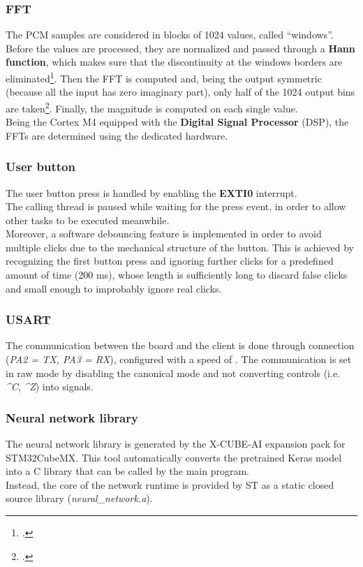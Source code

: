 \documentclass[12pt]{article}
\begin{document}
\subsubsection{FFT}
The PCM samples are considered in blocks of 1024 values, called ``windows''. Before the values are processed, they are normalized and passed through a \textbf{Hann function}, which makes sure that the discontinuity at the windows borders are eliminated\footcite{engelberg2008digital}. Then the FFT is computed and, being the output symmetric (because all the input has zero imaginary part), only half of the 1024 output bins are taken\footcite{parker2017digital}. Finally, the magnitude is computed on each single value.\\
Being the Cortex M4 equipped with the \textbf{Digital Signal Processor} (DSP), the FFTs are determined using the dedicated hardware.

\subsubsection{User button}
The user button press is handled by enabling the \textbf{EXTI0} interrupt.\\
The calling thread is paused while waiting for the press event, in order to allow other tasks to be executed meanwhile.\\
Moreover, a software debouncing feature is implemented in order to avoid multiple clicks due to the mechanical structure of the button. This is achieved by recognizing the first button press and ignoring further clicks for a predefined amount of time (200 ms), whose length is sufficiently long to discard false clicks and small enough to improbably ignore real clicks.

\subsubsection{USART}
The communication between the board and the client is done through  connection (\textit{PA2 = TX, PA3 = RX}), configured with a speed of . The communication is set in raw mode by disabling the canonical mode and not converting controls (i.e. \textit{\^{}C}, \textit{\^{}Z}) into signals.

\subsubsection{Neural network library}
The neural network library is generated by the X-CUBE-AI expansion pack for STM32CubeMX. This tool automatically converts the pretrained Keras model into a C library that can be called by the main program.\\
Instead, the core of the network runtime is provided by ST as a static closed source library (\textit{neural\_network.a}).
\end{document}
